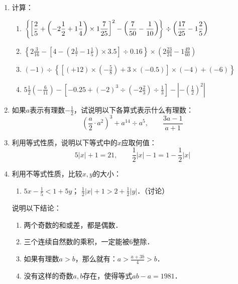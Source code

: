 \begin{enumerate}
	\item 计算：
	\begin{enumerate}
		\item $\left\{\left[\dfrac{2}{5}+\left(-2\dfrac{1}{2}+1\dfrac{1}{4}\right)\times 1\dfrac{7}{25}\right]^2-\left(\dfrac{7}{50}-\dfrac{1}{10}\right)     \right\}\div\left(\dfrac{17}{25}-1 \dfrac{2}{5}\right) $
		\item $\left\{2 \frac{3}{16}-\left[4-\left(2 \frac{1}{7}-1 \frac{1}{5}\right) \times 3.5\right] \div 0.16\right\} 
		\times\left(2 \frac{23}{24}-1 \frac{49}{60}\right) $
		\item $(-1)\div \left\{\left[(+12) \times\left(-\frac{5}{8}\right)+3 \times(-0.5) \right] \times(-4)+(-6)\right\} $
		\item $5 \frac{1}{2}\left(-\frac{6}{11}\right)-\left[-0.25+(-2)^{3}\div \left(-2 \frac{2}{3}\right) \div \frac{1}{3}\right]-\left|-\left(\frac{1}{2}\right)^{2}\right|$
	\end{enumerate}
	
	\item   如果$a$表示有理数$-\frac{1}{2}$，试说明以下各算式表示什么有理数：
	\[\left(\frac{a}{2}\cdot a^2\right)^3+a^{14}\div a^5,\qquad \frac{3a-1}{a+1}  \]
	
	\item   利用等式性质，说明以下等式中的$x$应取何值：
	\[5|x|+1=21,\qquad \frac{1}{2}|x|-1=1-\frac{1}{2}|x|  \]
	
	\item  利用不等式性质，比较$x,  y$的大小：
	\begin{enumerate}
		\item $5x-\frac{1}{5}<1+5y$；
		\staritem $\frac{1}{2}|x|+1>2+\frac{1}{2}|y|$．（讨论）
	\end{enumerate}
	
	\staritem 说明以下结论：
	\begin{enumerate}
		\item 两个奇数的和或差，都是偶数．
		\item 三个连续自然数的乘积，一定能被6整除．
		\item 如果有理数$a>b$，那么就有：$a>\frac{a+3b}{4}>b$．
		\item 没有这样的奇数$a,  b$存在，使得等式$ab-a=1981$．
	\end{enumerate}
	
	
\end{enumerate}
